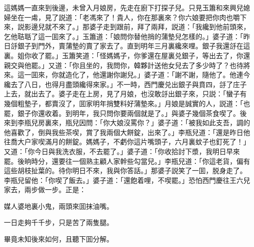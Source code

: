 這媽媽一直來到後邊，未曾入月娘房，先走在廚下打探子兒。只見玉簫和來興兒媳婦坐在一䖏，見了説道：「老馮來了！貴人，你在那裏來？你六娘要把你肉也嚼下來，説影邊兒就不來了。」那婆子走到跟前，拜了兩拜，説道：「我纔到他前頭來，乞他聐聒了這一囬來了。」玉簫道：「娘問你替他捎的蒲墊兒怎樣的。」婆子道：「昨日㧱銀子到門外，賣蒲墊的賣了家去了。直到明年三月裏纔來哩。銀子我還㧱在這裏。姐你收了罷。」玉簫笑道：「怪媽媽子，你爹還在屋裏兑銀子，等出去了，你還親交與他罷。」又道：「你且坐的，我問你，韓夥計送他女兒去了多少時了？也待將來。這一囬來，你就造化了，他還謝你謝兒。」婆子道：「謝不謝，隨他了。他連今纔去了八日，也得月盡頭纔得來家。」不一時，西門慶兑出銀子與賁四，㧱了庄子上去，就出去了。婆子走在上房，見了月娘，也沒敢㧱出銀子來，只説：「蠻子有幾個粗墊子，都賣沒了，囬家明年捎雙料好蒲墊來。」月娘是誠實的人，説道：「也罷，銀子你還收着。到明年，我只問你要兩個就是了。」與婆子幾個茶食喫了。後來到李瓶兒房裏來，瓶兒因問：「你大娘沒罵你？」婆子道：「被我如此支吾，調的他喜歡了，倒與我些茶喫，賞了我兩個大餅錠，出來了。」李瓶兒道：「還是昨日他往喬大户家喫滿月的餅錠。媽媽子，不虧你這片嘴頭子，六月裏蚊子也釘死了！」又道：「你今日與我洗衣服，不去罷了。」婆子道：「你收拾討下漿，我明日早來罷。後晌時分，還要往一個熟主顧人家幹些勾當兒。」李瓶兒道：「你這老貨，偏有這些胡枝扯葉的。待你明日不來，我與你答話。」那婆子説笑了一囬，脱身走了。李瓶兒留他：「你喫了飯去。」婆子道：「還飽着哩，不喫罷。」恐怕西門慶往王六兒家去，兩步做一步。正是：

\begin{myquote}
媒人婆地裏小鬼，兩頭來囬抹油嘴。

一日走夠千千步，只是苦了兩隻腿。
\end{myquote}

畢竟未知後來如何，且聽下囬分解。

